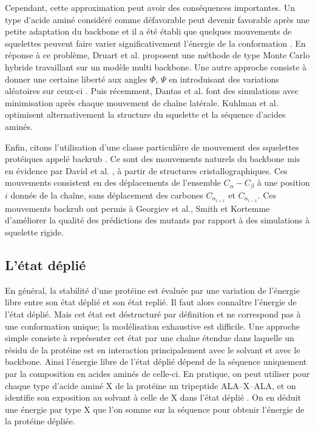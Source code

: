 Cependant, cette approximation peut avoir des conséquences importantes. Un type d'acide aminé considéré comme défavorable peut devenir favorable après une petite adaptation du backbone et il a été établi que quelques mouvements de squelettes peuvent faire varier significativement l'énergie de la conformation \cite{Desjarlais99}.
En réponse à ce problème, Druart et al. \cite{Druart16} proposent une méthode de type Monte Carlo hybride travaillant sur un modèle multi backbone. Une autre approche consiste à donner une certaine liberté aux angles $\Phi$, $\Psi$ en introduisant des variations aléatoires sur ceux-ci \cite{Desjarlais99}. Puis récemment, Dantas et al. \cite{Dantas07} font des simulations avec minimisation après chaque mouvement de chaîne latérale. Kuhlman et al. \cite{Kuhlman03}  optimisent alternativement la structure du squelette et la séquence d'acides aminés.

Enfin, citons l'utilisation d'une classe particulière de mouvement des squelettes protéiques appelé \og backrub \fg. Ce sont des mouvements naturels du backbone mis en évidence par David et al. \cite{Davis06}, à partir de structures cristallographiques. Ces mouvements consistent en des déplacements de l'ensemble $C_{\alpha}-C_{\beta}$ à une position $i$ donnée de la chaîne, sans déplacement des carbones $C_{\alpha_{i+1}}$ et $C_{\alpha_{i-1}}$. Ces mouvements backrub ont permis à Georgiev et al., Smith et Kortemme \cite{Georgiev08,Smith08} d'améliorer la qualité des prédictions des mutants par rapport à des simulations à squelette rigide.

\subsection{L'état déplié }
\label{sub:deplie}
En général, la stabilité d'une protéine est évaluée par une variation de l'énergie libre entre son état déplié et son état replié. Il faut alors connaître l'énergie de l'état déplié. Mais cet état est déstructuré par définition et ne correspond pas à une conformation unique; la modélisation exhaustive est difficile. Une approche simple consiste à représenter cet état par une chaîne étendue dans laquelle un résidu de la protéine est en interaction principalement avec le solvant et avec le backbone. Ainsi l'énergie libre de l'état déplié dépend de la séquence uniquement par la composition en acides aminés de celle-ci. En pratique, on peut utiliser pour chaque type d'acide aminé X de la protéine  un tripeptide ALA--X--ALA, et on identifie son exposition au solvant à celle de X dans l'état déplié \cite{Dahiyat96}. On en déduit une énergie par type X que l'on somme sur la séquence pour obtenir l'énergie de la protéine dépliée. 

